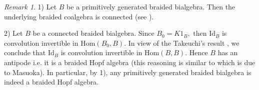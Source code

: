 \documentclass[english]{amsart}
\numberwithin{equation}{section}
\numberwithin{figure}{section}
\theoremstyle{plain}
\theoremstyle{definition}
\theoremstyle{definition}
\theoremstyle{remark}
\theoremstyle{remark}
\newtheorem{rem}[thm]{Remark}
\theoremstyle{plain}
\theoremstyle{plain}
\theoremstyle{plain}
\begin{document}
\begin{rem}
\label{rem:ConnIsHopf}1) Let $B$ be a primitively generated braided
bialgebra. Then the underlying braided coalgebra is connected (see
\cite[Proposition 5.8]{Ardizzoni-Universal}). 

2) Let $B$ be a connected braided bialgebra. Since $B_{0}=K1_{B},$
then $\mathrm{Id}_{B}$ is convolution invertible in $\mathrm{Hom}(B_{0},B)$.
In view of the Takeuchi's result \cite[Lemma 5.2.10]{Montgomery},
we conclude that $\mathrm{Id}_{B}$ is convolution invertible in $\mathrm{Hom}(B,B)$.
Hence $B$ has an antipode i.e. it is a braided Hopf algebra (this
reasoning is similar to \cite[Remark 9.17]{Ardizzoni-SFFS} which
is due to Masuoka). In particular, by 1), any primitively generated
braided bialgebra is indeed a braided Hopf algebra. \end{rem}
\end{document}
